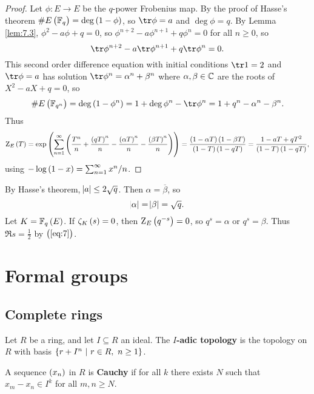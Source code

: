 \begin{proof}
Let $ \phi : E \to E $ be the $ q $-power Frobenius map. By the proof of Hasse's theorem $ \#E\br{\FF_q} = \deg \br{1 - \phi} $, so $ \tr \phi = a $ and $ \deg \phi = q $. By Lemma \ref{lem:7.3}, $ \phi^2 - a\phi + q = 0 $, so $ \phi^{n + 2} - a\phi^{n + 1} + q\phi^n = 0 $ for all $ n \ge 0 $, so
$$ \tr \phi^{n + 2} - a\tr \phi^{n + 1} + q\tr \phi^n = 0. $$
This second order difference equation with initial conditions $ \tr 1 = 2 $ and $ \tr \phi = a $ has solution $ \tr \phi^n = \alpha^n + \beta^n $ where $ \alpha, \beta \in \mathbb{C} $ are the roots of $ X^2 - aX + q = 0 $, so
$$ \#E\br{\FF_{q^n}} = \deg \br{1 - \phi^n} = 1 + \deg \phi^n - \tr \phi^n = 1 + q^n - \alpha^n - \beta^n. $$
Thus
$$ \Z_E\br{T} = \exp \br{\sum_{n = 1}^\infty \br{\dfrac{T^n}{n} + \dfrac{\br{qT}^n}{n} - \dfrac{\br{\alpha T}^n}{n} - \dfrac{\br{\beta T}^n}{n}}} = \dfrac{\br{1 - \alpha T}\br{1 - \beta T}}{\br{1 - T}\br{1 - qT}} = \dfrac{1 - aT + qT^2}{\br{1 - T}\br{1 - qT}}, $$
using $ -\log \br{1 - x} = \sum_{n = 1}^\infty x^n / n $.
\end{proof}

\begin{remark*}
By Hasse's theorem, $ \abs{a} \le 2\sqrt{q} $. Then $ \alpha = \overline{\beta} $, so
\begin{equation}
\label{eq:7}
\abs{\alpha} = \abs{\beta} = \sqrt{q}.
\end{equation}
Let $ K = \FF_q\br{E} $. If $ \zeta_K\br{s} = 0 $, then $ \Z_E\br{q^{-s}} = 0 $, so $ q^s = \alpha $ or $ q^s = \beta $. Thus $ \Re s = \tfrac{1}{2} $ by $ \br{\ref{eq:7}} $.
\end{remark*}

\pagebreak

\section{Formal groups}

\subsection{Complete rings}

\begin{definition*}
Let $ R $ be a ring, and let $ I \subseteq R $ an ideal. The \textbf{$ I $-adic topology} is the topology on $ R $ with basis $ \cbr{r + I^n \st r \in R, \ n \ge 1} $.
\end{definition*}

\begin{definition*}
A sequence $ \br{x_n} $ in $ R $ is \textbf{Cauchy} if for all $ k $ there exists $ N $ such that $ x_m - x_n \in I^k $ for all $ m, n \ge N $.
\end{definition*}

